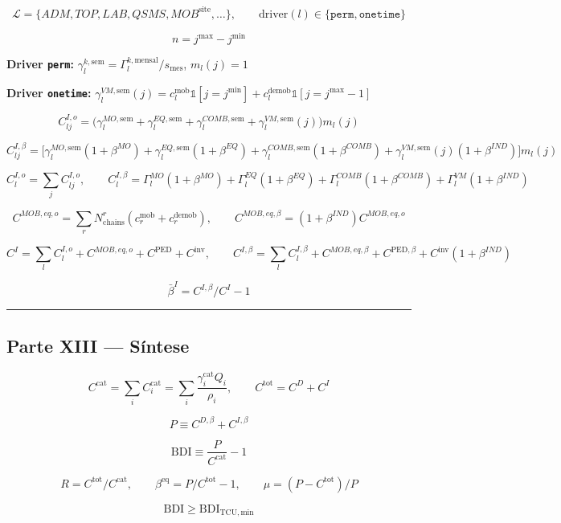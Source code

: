 \documentclass[
  10pt,
]{article}
\begin{document}
\[\mathcal{L}=\{ADM,TOP,LAB,QSMS,MOB^{\text{site}},\ldots\}, \qquad \text{driver}(l)\in\{\texttt{perm},\texttt{onetime}\}\]

\[n=j^{\max}-j^{\min}\]

\textbf{Driver \texttt{perm}:}
\(\gamma_l^{k,\text{sem}}=\Gamma_l^{k,\text{mensal}}/s_{\text{mes}}\),
\(m_l(j)=1\)

\textbf{Driver \texttt{onetime}:}
\(\gamma_l^{VM,\text{sem}}(j)=c_l^{\text{mob}}\mathbb{1}[j=j^{\min}]+c_l^{\text{demob}}\mathbb{1}[j=j^{\max}-1]\)

\[C_{lj}^{I,o}=\big(\gamma_l^{MO,\text{sem}}+\gamma_l^{EQ,\text{sem}}+\gamma_l^{COMB,\text{sem}}+\gamma_l^{VM,\text{sem}}(j)\big)m_l(j)\]

\[\boxed{C_{lj}^{I,\beta}=\big[\gamma_l^{MO,\text{sem}}(1+\beta^{MO})+\gamma_l^{EQ,\text{sem}}(1+\beta^{EQ})+\gamma_l^{COMB,\text{sem}}(1+\beta^{COMB})+\gamma_l^{VM,\text{sem}}(j)(1+\beta^{IND})\big]m_l(j)}\]

\[C_l^{I,o}=\sum_jC_{lj}^{I,o}, \qquad C_l^{I,\beta}=\Gamma_l^{MO}(1+\beta^{MO})+\Gamma_l^{EQ}(1+\beta^{EQ})+\Gamma_l^{COMB}(1+\beta^{COMB})+\Gamma_l^{VM}(1+\beta^{IND})\]

\[\boxed{C^{MOB,eq,o}=\sum_rN_{\text{chains}}^r(c_r^{\text{mob}}+c_r^{\text{demob}})}, \qquad C^{MOB,eq,\beta}=(1+\beta^{IND})C^{MOB,eq,o}\]

\[C^I=\sum_lC_l^{I,o}+C^{MOB,eq,o}+C^{\mathrm{PED}}+C^{\mathrm{inv}}, \qquad C^{I,\beta}=\sum_lC_l^{I,\beta}+C^{MOB,eq,\beta}+C^{\mathrm{PED},\beta}+C^{\mathrm{inv}}(1+\beta^{IND})\]

\[\bar\beta^I=C^{I,\beta}/C^I-1\]

\begin{center}\rule{0.5\linewidth}{0.5pt}\end{center}

\hypertarget{parte-xiii-suxedntese}{%
\subsection{Parte XIII --- Síntese}\label{parte-xiii-suxedntese}}

\[C^{\mathrm{cat}}=\sum_iC_i^{\mathrm{cat}}=\sum_i\frac{\gamma_i^{\mathrm{cat}}Q_i}{\rho_i}, \qquad C^{\mathrm{tot}}=C^D+C^I\]

\[P\equiv C^{D,\beta}+C^{I,\beta}\]

\[\boxed{\mathrm{BDI}\equiv\frac{P}{C^{\mathrm{cat}}}-1}\]

\[R=C^{\mathrm{tot}}/C^{\mathrm{cat}}, \qquad \beta^{\mathrm{eq}}=P/C^{\mathrm{tot}}-1, \qquad \mu=(P-C^{\mathrm{tot}})/P\]

\[\boxed{\mathrm{BDI}\ge\mathrm{BDI}_{\mathrm{TCU,min}}}\]
\end{document}
